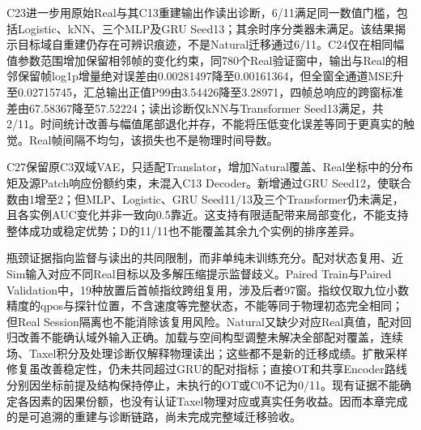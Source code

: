 C23进一步用原始Real与其C13重建输出作读出诊断，6/11满足同一数值门槛，包括Logistic、kNN、三个MLP及GRU Seed13；其余时序分类器未满足。该结果揭示目标域自重建仍存在可辨识痕迹，不是Natural迁移通过6/11。C24仅在相同幅值参数范围增加保留相邻帧的变化约束，同780个Real验证窗中，输出与Real的相邻保留帧log1p增量绝对误差由0.00281497降至0.00161364，但全窗全通道MSE升至0.02715745，汇总输出正值P99由3.54426降至3.28971，四帧总响应的跨窗标准差由67.58367降至57.52224；读出诊断仅kNN与Transformer Seed13满足，共2/11。时间统计改善与幅值尾部退化并存，不能将压低变化误差等同于更真实的触觉。Real帧间隔不均匀，该损失也不是物理时间导数。

C27保留原C3双域VAE，只适配Translator，增加Natural覆盖、Real坐标中的分布矩及源Patch响应份额约束，未混入C13 Decoder。新增通过GRU Seed12，使联合数由1增至2；但MLP、Logistic、GRU Seed11/13及三个Transformer仍未满足，且各实例AUC变化并非一致向0.5靠近。这支持有限适配带来局部变化，\mbox{不能}支持整体成功或稳定优势；D的11/11也不能覆盖其余九个实例的排序差异。

瓶颈证据指向监督与读出的共同限制，而非单纯未训练充分。配对状态复用、近Sim输入对应不同Real目标以及多解压缩提示监督歧义。Paired Train与Paired Validation中，19种放置后首帧指纹跨组复用，涉及后者97窗。指纹仅取九位小数精度的qpos与探针位置，不含速度等完整状态，不能等同于物理初态完全相同；但Real Session隔离也不能消除该复用风险。Natural又缺少对应Real真值，配对回归改善不能确认域外输入正确。加载与空间构型调整未解决全部配对覆盖，连续场、Taxel积分及处理诊断仅解释物理读出；这些都不是新的迁移成绩。扩散采样修复虽改善稳定性，仍未共同超过GRU的配对指标；直接OT和共享Encoder路线分别因坐标前提及结构保持停止，未执行的OT或C0不记为0/11。现有证据不能确定各因素的因果份额，也没有认证Taxel物理对应或真实任务收益。因而本章完成的是可追溯的重建与诊断链路，尚未完成完整域迁移验收。


